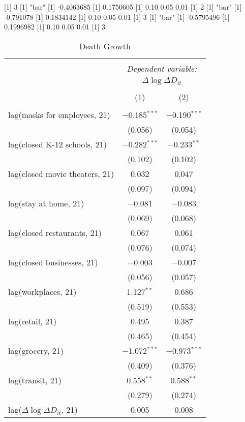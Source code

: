 [1] 3
[1] "bar"
[1] -0.4063685
[1] 0.1750605
[1] 0.10 0.05 0.01
[1] 2
[1] "bar"
[1] -0.791078
[1] 0.1834142
[1] 0.10 0.05 0.01
[1] 3
[1] "bar"
[1] -0.5795496
[1] 0.1996982
[1] 0.10 0.05 0.01
[1] 3

\begin{table}[!htbp] \centering 
  \caption{Death Growth} 
  \label{} 
\begin{tabular}{@{\extracolsep{1pt}}lcc} 
\\[-1.8ex]\hline 
\hline \\[-1.8ex] 
 & \multicolumn{2}{c}{\textit{Dependent variable:}} \\ 
\cline{2-3} 
 & \multicolumn{2}{c}{$\Delta \log \Delta D_{it}$} \\ 
\\[-1.8ex] & (1) & (2)\\ 
\hline \\[-1.8ex] 
 lag(masks for employees, 21) & $-$0.185$^{***}$ & $-$0.190$^{***}$ \\ 
  & (0.056) & (0.054) \\ 
  lag(closed K-12 schools, 21) & $-$0.282$^{***}$ & $-$0.233$^{**}$ \\ 
  & (0.102) & (0.102) \\ 
  lag(closed movie theaters, 21) & 0.032 & 0.047 \\ 
  & (0.097) & (0.094) \\ 
  lag(stay at home, 21) & $-$0.081 & $-$0.083 \\ 
  & (0.069) & (0.068) \\ 
  lag(closed restaurants, 21) & 0.067 & 0.061 \\ 
  & (0.076) & (0.074) \\ 
  lag(closed businesses, 21) & $-$0.003 & $-$0.007 \\ 
  & (0.056) & (0.057) \\ 
  lag(workplaces, 21) & 1.127$^{**}$ & 0.686 \\ 
  & (0.519) & (0.553) \\ 
  lag(retail, 21) & 0.495 & 0.387 \\ 
  & (0.465) & (0.454) \\ 
  lag(grocery, 21) & $-$1.072$^{***}$ & $-$0.973$^{***}$ \\ 
  & (0.409) & (0.376) \\ 
  lag(transit, 21) & 0.558$^{**}$ & 0.588$^{**}$ \\ 
  & (0.279) & (0.274) \\ 
  lag($\Delta \log \Delta D_{it}$, 21) & 0.005 & 0.008 \\ 

\end{tabular}
\end{table}
